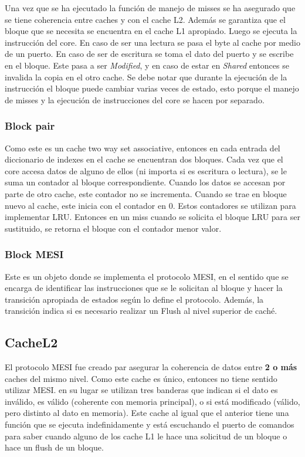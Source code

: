 \documentclass {article}
\begin{document}
Una vez que se ha ejecutado la función de manejo de misses se ha asegurado que se tiene coherencia
entre caches y con el cache L2. Además se garantiza que el bloque que se necesita se encuentra en el
cache L1 apropiado. Luego se ejecuta la instrucción del core. En caso de ser una lectura se pasa el
byte al cache por medio de un puerto. En caso de ser de escritura se toma el dato del puerto y se
escribe en el bloque. Este pasa a ser \textit{Modified}, y en caso de estar en \textit{Shared}
entonces se invalida la copia en el otro cache. Se debe notar que durante la ejecución de la
instrucción el bloque puede cambiar varias veces de estado, esto porque el manejo de misses y la
ejecución de instrucciones del core se hacen por separado.

\subsubsection{Block pair}

Como este es un cache two way set associative, entonces en cada entrada del diccionario de indexes en
el cache se encuentran dos bloques. Cada vez que el core accesa datos de alguno de ellos (ni importa
si es escritura o lectura), se le suma un contador al bloque correspondiente. Cuando los datos se
accesan por parte de otro cache, este contador no se incrementa. Cuando se trae en bloque nuevo al
cache, este inicia con el contador en 0. Estos contadores se utilizan para implementar LRU. Entonces
en un miss cuando se solicita el bloque LRU para ser sustituido, se retorna el bloque con el
contador menor valor.

\subsubsection{Block MESI}

Este es un objeto donde se implementa el protocolo MESI, en el sentido que se encarga de identificar
las instrucciones que se le solicitan al bloque y hacer la transición apropiada de estados según lo
define el protocolo. Además, la transición indica si es necesario realizar un Flush al nivel
superior de caché.

\subsection{CacheL2}

El protocolo MESI fue creado par asegurar la coherencia de datos entre \textbf{2 o más} caches del
mismo nivel. Como este cache es único, entonces no tiene sentido utilizar MESI. en su lugar se
utilizan tres banderas que indican si el dato es inválido, es válido (coherente con memoria
principal), o si está modificado (válido, pero distinto al dato en memoria). Este cache al igual que
el anterior tiene una función que se ejecuta indefinidamente y está escuchando el puerto de comandos
para saber cuando alguno de los cache L1 le hace una solicitud de un bloque o hace un flush de un
bloque.
\end{document}
